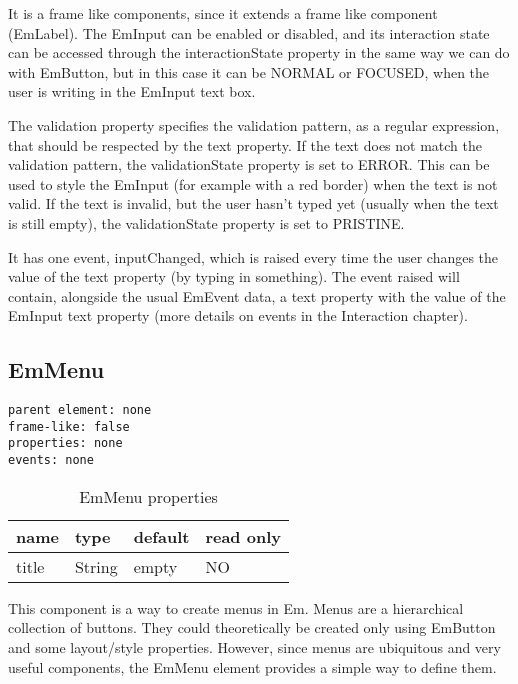 It is a frame like components, since it extends a frame like component (EmLabel).
The EmInput can be enabled or disabled, and its interaction state can be accessed through the interactionState property in
the same way we can do with EmButton, but in this case it can be NORMAL or FOCUSED, when the user is
writing in the EmInput text box.

The validation property specifies the validation pattern, as a regular expression, that should be respected
by the text property. If the text does not match the validation pattern, the validationState property
is set to ERROR. This can be used to style the EmInput (for example with a red border) when the text is
not valid. If the text is invalid, but the user hasn't typed yet (usually when the text is still empty),
the validationState property is set to PRISTINE.

It has one event, inputChanged, which is raised every time the user changes the value of the text
property (by typing in something). The event raised will contain, alongside the usual EmEvent data, a
text property with the value of the EmInput text property (more details on events in the Interaction chapter).

\subsection{EmMenu}
\label{sec:emmenu}

\begin{verbatim}
parent element: none
frame-like: false
properties: none
events: none
\end{verbatim}

\begin{table}[ht]
\caption{EmMenu properties}
\centering
\begin{tabular}{l l l l}
\hline\hline
name & type & default & read only \\ [0.5ex]
\hline %
title & String & empty & NO \\ [1ex] %
\hline %
\end{tabular}

\end{table}

This component is a way to create menus in Em. Menus are a hierarchical collection of buttons. They could
theoretically be created only using EmButton and some layout/style properties. However, since menus
are ubiquitous and very useful components, the EmMenu element provides a simple way to define them.

